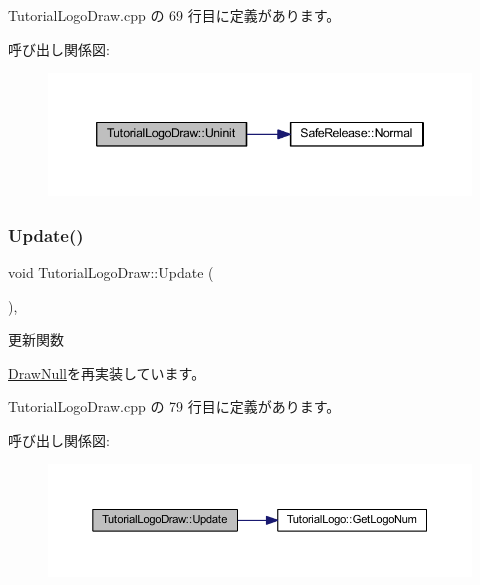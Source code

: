  Tutorial\+Logo\+Draw.\+cpp の 69 行目に定義があります。

呼び出し関係図\+:\nopagebreak
\begin{figure}[H]
\begin{center}
\leavevmode
\includegraphics[width=346pt]{class_tutorial_logo_draw_a949fb70954e3df28f87b8ed5c61bf8f1_cgraph}
\end{center}
\end{figure}
\mbox{\label{class_tutorial_logo_draw_af69405fcc8b20684a19e982726d93ffa}} 
\subsubsection{\texorpdfstring{Update()}{Update()}}
{\footnotesize\ttfamily void Tutorial\+Logo\+Draw\+::\+Update (\begin{DoxyParamCaption}{ }\end{DoxyParamCaption})\hspace{0.3cm}{\ttfamily [override]}, {\ttfamily [virtual]}}



更新関数 



\mbox{\hyperlink{class_draw_null_a0149bcf84a34b138642ab7975ae46f30}{Draw\+Null}}を再実装しています。



 Tutorial\+Logo\+Draw.\+cpp の 79 行目に定義があります。

呼び出し関係図\+:\nopagebreak
\begin{figure}[H]
\begin{center}
\leavevmode
\includegraphics[width=350pt]{class_tutorial_logo_draw_af69405fcc8b20684a19e982726d93ffa_cgraph}
\end{center}
\end{figure}


